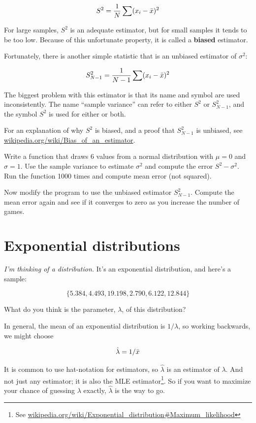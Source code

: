\documentclass[12pt]{book}
\begin{document}
\[ S^2 = \frac{1}{N} \sum (x_i - \bar{x})^2 \] 

For large samples, $S^2$ is an adequate estimator, but for small
samples it tends to be too low.  Because of this unfortunate
property, it is called a {\bf biased} estimator.

Fortunately, there is another simple statistic that is an unbiased
estimator of $\sigma^2$:

\[ S_{N-1}^2 = \frac{1}{N-1} \sum (x_i - \bar{x})^2 \] 

The biggest problem with this estimator is that its name and symbol
are used inconsistently.  The name ``sample variance'' can refer to
either $S^2$ or $S_{N-1}^2$, and the symbol $S^2$ is used
for either or both.

For an explanation of why $S^2$ is biased, and a proof that
$S_{N-1}^2$ is unbiased, see
\url{wikipedia.org/wiki/Bias_of_an_estimator}.

\begin{ex}

Write a function that draws 6 values from a normal distribution with
$\mu=0$ and $\sigma=1$.  Use the sample variance to estimate
$\sigma^2$ and compute the error $S^2 - \sigma^2$.  Run the function 1000
times and compute mean error (not squared).

Now modify the program to use the unbiased estimator $S_{N-1}^2$.
Compute the mean error again and see if it converges to zero as you
increase the number of games.

\end{ex}

\section{Exponential distributions}

{\em I'm thinking of a distribution.}  It's an exponential distribution, and 
here's a sample:

\[ \{ 5.384, 4.493, 19.198, 2.790, 6.122, 12.844 \} \]

What do you think is the parameter, $\lambda$, of this distribution?

\newcommand{\lamhat}{\hat{\lambda}}
\newcommand{\lamhatmed}{\hat{\lambda}_{1/2}}

In general, the mean of an exponential distribution is $1 / \lambda$,
so working backwards, we might choose

\[ \lamhat = 1 / \xbar \]

It is common to use hat-notation for estimators, so $\lamhat$ is an
estimator of $\lambda$.  And not just any estimator; it is also the
MLE estimator\footnote{See
\url{wikipedia.org/wiki/Exponential_distribution#Maximum_likelihood}}.
So if you want to maximize your chance of guessing $\lambda$ exactly,
$\lamhat$ is the way to go.
\end{document}
